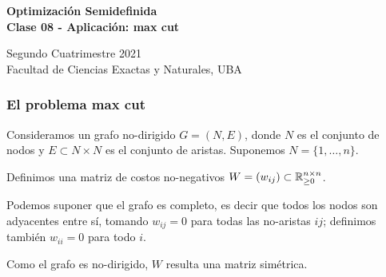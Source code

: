 \documentclass[aspectratio=169,12pt,spanish]{beamer}
\begin{document}

\begin{frame}

 \begin{center}

\Large\textbf{Optimización Semidefinida} \\
\large\textbf{Clase 08 - Aplicación: max cut}




\vspace{1cm}
 Segundo Cuatrimestre 2021
 \\
 {\small Facultad de Ciencias Exactas y Naturales, UBA}
 \end{center}

\end{frame}




\begin{frame}
\frametitle{El problema max cut}

Consideramos un grafo no-dirigido $G = (N, E)$, donde $N$ es el conjunto de nodos y $E \subset N \times N$ es el conjunto de aristas. Suponemos $N = \{1, \dots, n\}$.

Definimos una matriz de costos no-negativos $W = (w_{ij}) \subset \mathbb{R}_{\ge 0}^{n \times n}$.

Podemos suponer que el grafo es completo, es decir que todos los nodos son adyacentes entre sí, tomando $w_{ij} = 0$ para todas las no-aristas $ij$; definimos también $w_{ii} = 0$ para todo $i$.

Como el grafo es no-dirigido, $W$ resulta una matriz simétrica.

\end{frame}

\end{document}

